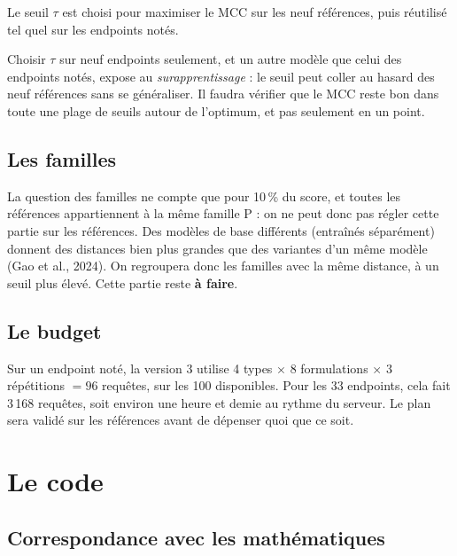 \documentclass[11pt,a4paper]{report}
\theoremstyle{definition}
\theoremstyle{plain}
\begin{document}
Le seuil $\tau$ est choisi pour maximiser le MCC sur les neuf références, puis réutilisé tel quel sur les endpoints notés.

\begin{limite}
Choisir $\tau$ sur neuf endpoints seulement, et un autre modèle que celui des endpoints notés, expose au \emph{surapprentissage} : le seuil peut coller au hasard des neuf références sans se généraliser. Il faudra vérifier que le MCC reste bon dans toute une plage de seuils autour de l'optimum, et pas seulement en un point.
\end{limite}

\section{Les familles}

La question des familles ne compte que pour 10\,\% du score, et toutes les références appartiennent à la même famille P : on ne peut donc pas régler cette partie sur les références. Des modèles de base différents (entraînés séparément) donnent des distances bien plus grandes que des variantes d'un même modèle (Gao et al., 2024). On regroupera donc les familles avec la même distance, à un seuil plus élevé. Cette partie reste \textbf{à faire}.

\section{Le budget}

Sur un endpoint noté, la version 3 utilise 4 types $\times$ 8 formulations $\times$ 3 répétitions $= 96$ requêtes, sur les 100 disponibles. Pour les 33 endpoints, cela fait 3\,168 requêtes, soit environ une heure et demie au rythme du serveur. Le plan sera validé sur les références avant de dépenser quoi que ce soit.

\chapter{Le code}

\section{Correspondance avec les mathématiques}
\end{document}
